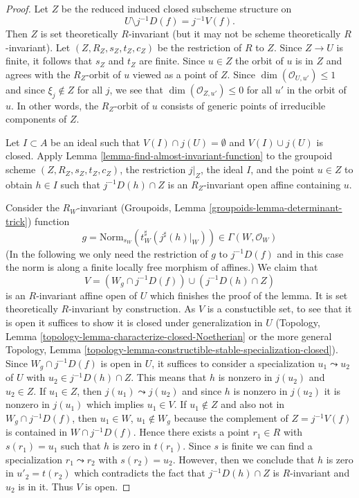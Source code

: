 \begin{proof}
\medskip\noindent
Let $Z$ be the reduced induced closed subscheme structure on
$$
U \setminus j^{-1}D(f) = j^{-1}V(f).
$$
Then $Z$ is set theoretically
$R$-invariant (but it may not be scheme theoretically $R$-invariant).
Let $(Z, R_Z, s_Z, t_Z, c_Z)$ be the restriction of $R$ to $Z$.
Since $Z \to U$ is finite, it follows that $s_Z$ and $t_Z$ are finite.
Since $u \in Z$ the orbit of $u$ is in $Z$ and agrees with the
$R_Z$-orbit of $u$ viewed as a point of $Z$. Since
$\dim(\mathcal{O}_{U, u'}) \leq 1$ and since $\xi_j \not \in Z$
for all $j$, we see that $\dim(\mathcal{O}_{Z, u'}) \leq 0$ for
all $u'$ in the orbit of $u$. In other words, the $R_Z$-orbit of $u$
consists of generic points of irreducible components of $Z$.

\medskip\noindent
Let $I \subset A$ be an ideal such that $V(I) \cap j(U) =\emptyset$
and $V(I) \cup j(U)$ is closed. Apply
Lemma \ref{lemma-find-almost-invariant-function} to
the groupoid scheme $(Z, R_Z, s_Z, t_Z, c_Z)$, the restriction $j|_Z$,
the ideal $I$, and the point $u \in Z$ to obtain $h \in I$ such that
$j^{-1}D(h) \cap Z$ is an $R_Z$-invariant open affine containing $u$.

\medskip\noindent
Consider the $R_W$-invariant (Groupoids, Lemma
\ref{groupoids-lemma-determinant-trick}) function
$$
g = 
\text{Norm}_{s_W}(t_W^\sharp(j^\sharp(h)|_W)) \in \Gamma(W, \mathcal{O}_W)
$$
(In the following we only need the restriction of $g$ to $j^{-1}D(f)$ and
in this case the norm is along a finite locally free morphism of affines.)
We claim that
$$
V = (W_g \cap j^{-1}D(f)) \cup (j^{-1}D(h) \cap Z)
$$
is an $R$-invariant affine open of $U$ which finishes the proof of the lemma.
It is set theoretically $R$-invariant by construction. As $V$ is a
constuctible set, to see that it is open it suffices to show it is
closed under generalization in $U$ (Topology, Lemma
\ref{topology-lemma-characterize-closed-Noetherian}
or the more general
Topology, Lemma
\ref{topology-lemma-constructible-stable-specialization-closed}).
Since $W_g \cap j^{-1}D(f)$ is open in $U$, it suffices to consider
a specialization $u_1 \leadsto u_2$ of $U$ with
$u_2 \in j^{-1}D(h) \cap Z$.
This means that $h$ is nonzero in $j(u_2)$ and $u_2 \in Z$.
If $u_1 \in Z$, then $j(u_1) \leadsto j(u_2)$ and since
$h$ is nonzero in $j(u_2)$ it is nonzero in $j(u_1)$ which
implies $u_1 \in V$. If $u_1 \not \in Z$ and
also not in $W_g \cap j^{-1}D(f)$, then $u_1 \in W$, $u_1 \not \in W_g$
because the complement of $Z = j^{-1}V(f)$ is contained in $W \cap j^{-1}D(f)$.
Hence there exists a point $r_1 \in R$ with $s(r_1) = u_1$
such that $h$ is zero in $t(r_1)$. Since $s$ is finite we
can find a specialization $r_1 \leadsto r_2$ with $s(r_2) = u_2$.
However, then we conclude that $h$ is zero in $u'_2 = t(r_2)$
which contradicts the fact that $j^{-1}D(h) \cap Z$
is $R$-invariant and $u_2$ is in it. Thus $V$ is open.


\end{proof}
